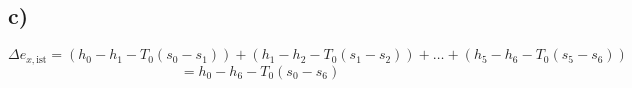 

\subsection*{c)}

\[
\Delta e_{x, \text{ist}} = (h_0 - h_1 - T_0 (s_0 - s_1)) + (h_1 - h_2 - T_0 (s_1 - s_2)) + \ldots + (h_5 - h_6 - T_0 (s_5 - s_6))
\]
\[
= h_0 - h_6 - T_0 (s_0 - s_6)
\]